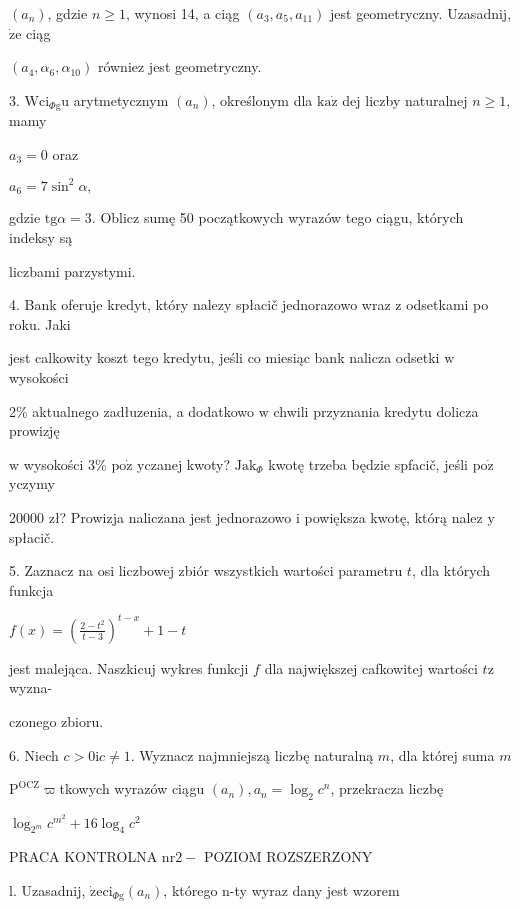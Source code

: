 \documentclass[a4paper,12pt]{article}
\begin{document}
$(a_{n})$, gdzie $ n\geq 1$, wynosi 14, a ciąg $(a_{3},a_{5},a_{11})$ jest geometryczny. Uzasadnij, $\dot{\mathrm{z}}\mathrm{e}$ ciąg

$(a_{4},\alpha_{6},\alpha_{10})$ równiez jest geometryczny.

3. $\mathrm{W}\mathrm{c}\mathrm{i}_{\Phi \mathrm{g}}\mathrm{u}$ arytmetycznym $(a_{n})$, określonym dla $\mathrm{k}\mathrm{a}\dot{\mathrm{z}}$ dej liczby naturalnej $n\geq 1$, mamy

$a_{3}=0$ oraz

$a_{6}=7\sin^{2}\alpha,$

gdzie $\mathrm{t}\mathrm{g}\alpha=3$. Oblicz sumę 50 początkowych wyrazów tego ciągu, których indeksy są

liczbami parzystymi.

4. Bank oferuje kredyt, który nalezy spłacič jednorazowo wraz $\mathrm{z}$ odsetkami po roku. Jaki

jest calkowity koszt tego kredytu, jeśli co miesiąc bank nalicza odsetki $\mathrm{w}$ wysokości

2\% aktualnego zadłuzenia, a dodatkowo $\mathrm{w}$ chwili przyznania kredytu dolicza prowizję

$\mathrm{w}$ wysokości 3\% $\mathrm{p}\mathrm{o}\dot{\mathrm{z}}$ yczanej kwoty? $\mathrm{J}\mathrm{a}\mathrm{k}_{\Phi}$ kwotę trzeba będzie spfacič, jeśli $\mathrm{p}\mathrm{o}\dot{\mathrm{z}}$ yczymy

20000 zł? Prowizja naliczana jest jednorazowo $\mathrm{i}$ powiększa kwotę, którą nalez $\mathrm{y}$ spłacič.

5. Zaznacz na osi liczbowej zbiór wszystkich wartości parametru $t$, dla których funkcja

$f(x)=(\displaystyle \frac{2-t^{2}}{t-3})^{t-x}+1-t$

jest malejąca. Naszkicuj wykres funkcji $f$ dla największej cafkowitej wartości $t\mathrm{z}$ wyzna-

czonego zbioru.

6. Niech $c > 0 \mathrm{i} c \neq 1$. Wyznacz najmniejszą liczbę naturalną $m$, dla której suma $m$

$\mathrm{P}^{\mathrm{O}\mathrm{C}\mathrm{Z}}\varpi$tkowych wyrazów ciągu $(a_{n}), a_{n}=\log_{2}c^{n}$, przekracza liczbę

$\log_{2^{m}}c^{m^{2}}+16\log_{4}c^{2}$




PRACA KONTROLNA $\mathrm{n}\mathrm{r} 2-$ POZIOM ROZSZERZONY

l. Uzasadnij, $\dot{\mathrm{z}}\mathrm{e}\mathrm{c}\mathrm{i}_{\Phi \mathrm{g}}(a_{n})$, którego n-ty wyraz dany jest wzorem
\end{document}
